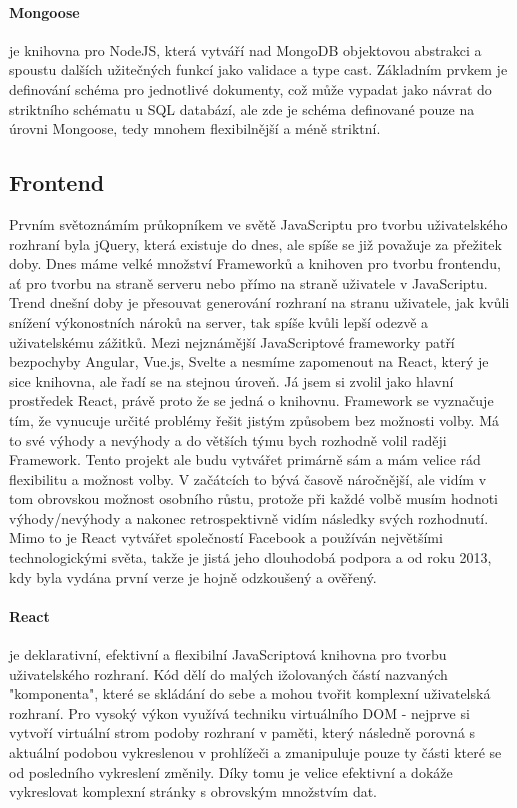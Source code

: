 \documentclass[thesis=B,czech]{FITthesis}[2019/12/23]
\begin{document}
\paragraph{Mongoose} je knihovna pro NodeJS, která vytváří nad MongoDB objektovou abstrakci a spoustu dalších užitečných funkcí jako validace a type cast. Základním prvkem je definování schéma pro jednotlivé dokumenty, což může vypadat jako návrat do striktního schématu u SQL databází, ale zde je schéma definované pouze na úrovni Mongoose, tedy mnohem flexibilnější a méně striktní.

\subsection{Frontend}
Prvním světoznámím průkopníkem ve světě JavaScriptu pro tvorbu uživatelského rozhraní byla jQuery, která existuje do dnes, ale spíše se již považuje za přežitek doby. Dnes máme velké množství Frameworků a knihoven pro tvorbu frontendu, ať pro tvorbu na straně serveru nebo přímo na straně uživatele v JavaScriptu. Trend dnešní doby je přesouvat generování rozhraní na stranu uživatele, jak kvůli snížení výkonostních nároků na server, tak spíše kvůli lepší odezvě a uživatelskému zážitků. Mezi nejznámější JavaScriptové frameworky patří bezpochyby Angular, Vue.js, Svelte a nesmíme zapomenout na React, který je sice knihovna, ale řadí se na stejnou úroveň. Já jsem si zvolil jako hlavní prostředek React, právě proto že se jedná o knihovnu. Framework se vyznačuje tím, že vynucuje určité problémy řešit jistým způsobem bez možnosti volby. Má to své výhody a nevýhody a do větších týmu bych rozhodně volil raději Framework. Tento projekt ale budu vytvářet primárně sám a mám velice rád flexibilitu a možnost volby. V začátcích to bývá časově náročnější, ale vidím v tom obrovskou možnost osobního růstu, protože při každé volbě musím hodnoti výhody/nevýhody a nakonec retrospektivně vidím následky svých rozhodnutí. Mimo to je React vytvářet společností Facebook a používán největšími technologickými světa, takže je jistá jeho dlouhodobá podpora a od roku 2013, kdy byla vydána první verze je hojně odzkoušený a ověřený.

\paragraph{React} je deklarativní, efektivní a flexibilní JavaScriptová knihovna pro tvorbu uživatelského rozhraní. Kód dělí do malých ižolovaných částí nazvaných "komponenta", které se skládání do sebe a mohou tvořit komplexní uživatelská rozhraní. Pro vysoký výkon využívá techniku virtuálního DOM - nejprve si vytvoří virtuální strom podoby rozhraní v paměti, který následně porovná s aktuální podobou vykreslenou v prohlížeči a zmanipuluje pouze ty části které se od posledního vykreslení změnily. Díky tomu je velice efektivní a dokáže vykreslovat komplexní stránky s obrovským množstvím dat.
\end{document}
